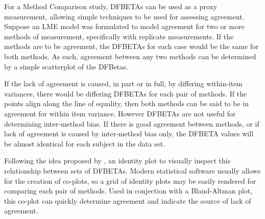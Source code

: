 \documentclass[12pt, a4paper]{report}
\theoremstyle{plain}
\theoremstyle{definition}
\theoremstyle{remark}
\begin{document}
For a Method Comparison study, DFBETAs can be used as a proxy measurement, allowing simple techniques to be used for assessing agreement. Suppose an LME model was formulated to model agreement for two or more methods of measurement, specifically with replicate measurements. If the methods are to be agreement, the DFBETAs for each case would be the same for both methods. As such, agreement between any two methods can be determined by a simple scatterplot of the DFBetas. 
	

If the lack of agreement is caused, in part or in full, by differing within-item variances, there would be differing DFBETAs for each pair of methods. If the points align along the line of equality, then both methods can be said to be in agreement for within item variance. However DFBETAs are not useful for determining inter-method bias. If there is good agreement between methods, or if lack of agreement is caused by inter-method bias only, the DFBETA values will be almost identical for each subject in the data set. 
	
Following the idea proposed by \citet{BA86}, an identity plot to visually inspect this relationship between sets of DFBETAs. Modern statistical software usually allows for the creation of co-plots, so a grid of identity plots may be easily rendered for comparing each pair of methods. Used in conjection with a Bland-Altman plot, this co-plot can quickly determine agreement and indicate the source of lack of agreement.
\end{document}
